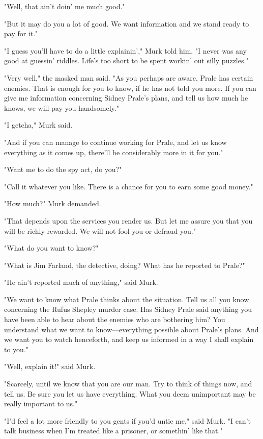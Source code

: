 \documentclass{novel}
\begin{document}
"Well, that ain't doin' me much good."

"But it may do you a lot of good. We want information and we stand ready to pay for it."

"I guess you'll have to do a little explainin'," Murk told him. "I never was any good at guessin' riddles. Life's too short to be spent workin' out silly puzzles."

"Very well," the masked man said. "As you perhaps are aware, Prale has certain enemies. That is enough for you to know, if he has not told you more. If you can give me information concerning Sidney Prale's plans, and tell us how much he knows, we will pay you handsomely."

"I getcha," Murk said.

"And if you can manage to continue working for Prale, and let us know everything as it comes up, there'll be considerably more in it for you."

"Want me to do the spy act, do you?"

"Call it whatever you like. There is a chance for you to earn some good money."

"How much?" Murk demanded.

"That depends upon the services you render us. But let me assure you that you will be richly rewarded. We will not fool you or defraud you."

"What do you want to know?"

"What is Jim Farland, the detective, doing? What has he reported to Prale?"

"He ain't reported much of anything," said Murk.

"We want to know what Prale thinks about the situation. Tell us all you know concerning the Rufus Shepley murder case. Has Sidney Prale said anything you have been able to hear about the enemies who are bothering him? You understand what we want to know---everything possible about Prale's plans. And we want you to watch henceforth, and keep us informed in a way I shall explain to you."

"Well, explain it!" said Murk.

"Scarcely, until we know that you are our man. Try to think of things now, and tell us. Be sure you let us have everything. What you deem unimportant may be really important to us."

"I'd feel a lot more friendly to you gents if you'd untie me," said Murk. "I can't talk business when I'm treated like a prisoner, or somethin' like that."
\end{document}
